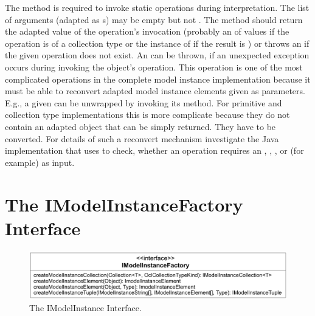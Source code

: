 The method 
is required to invoke static operations during interpretation. The list of 
arguments (adapted as s) may be empty but
not . The method should return the adapted value of the operation's 
invocation (probably an  of values if the 
operation is of a collection type or the instance of 
if the result is ) or throws an 
 if the given operation does not 
exist. An  can be thrown, if an
unexpected exception occurs during invoking the object's operation. This operation is one 
of the most complicated operations in the complete model instance implementation
because it must be able to reconvert adapted model instance elements given as 
parameters. E.g., a given  can be unwrapped by 
invoking its  method. For primitive and collection type 
implementations this is more complicate because they do not contain an adapted 
object that can be simply returned. They have to be converted. For details of 
such a reconvert mechanism investigate the Java implementation that uses 
 to check, whether an operation requires an
, , , or  (for example) as input.



\section{The IModelInstanceFactory Interface}

\begin{figure}
	\centering
	\includegraphics[width=1.0\linewidth]{figures/modelInstanceTypeAdaptation/modelInstanceFactoryInterface}
	\caption{The IModelInstance Interface.}
	\label{pic:modelInstanceTypeAdaptation:modelInstanceFactoryInterface}
\end{figure}

